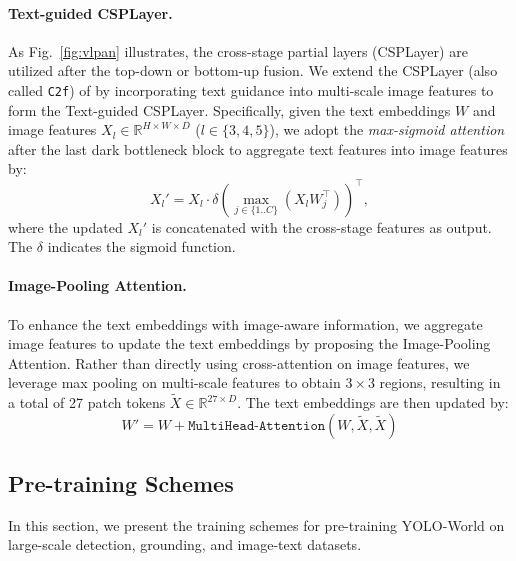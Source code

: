 \documentclass[10pt,twocolumn,letterpaper]{article}
\newcommand{\name}{YOLO-World}
\begin{document}
\paragraph{Text-guided CSPLayer.}
As Fig.~\ref{fig:vlpan} illustrates, the cross-stage partial layers (CSPLayer) are utilized after the top-down or bottom-up fusion.
We extend the CSPLayer (also called \texttt{C2f}) of \cite{yolov8_ultralytics} by incorporating text guidance into multi-scale image features to form the Text-guided CSPLayer.
Specifically, given the text embeddings $W$ and image features $X_l \in \mathbb{R}^{H\times W\times D}$ ($l \in \{3,4,5\}$),
we adopt the \textit{max-sigmoid attention} after the last dark bottleneck block to aggregate text features into image features by:
\begin{equation}
X_l' = X_l\cdot\delta(\max_{j\in\{1..C\}}(X_lW_j^{\top}))^{\top},
\end{equation}
where the updated $X_l'$ is concatenated with the cross-stage features as output. The $\delta$ indicates the sigmoid function.

\paragraph{Image-Pooling Attention.}
To enhance the text embeddings with image-aware information, we aggregate image features to update the text embeddings by proposing the Image-Pooling Attention.
Rather than directly using cross-attention on image features, we leverage max pooling on multi-scale features to obtain $3\!\times\!3$ regions, resulting in a total of 27 patch tokens $\tilde{X}\in \mathbb{R}^{27\times D}$.
The text embeddings are then updated by:
\begin{equation}
    W' = W + \texttt{MultiHead-Attention}(W, \tilde{X}, \tilde{X})
\end{equation}

\subsection{Pre-training Schemes}
In this section, we present the training schemes for pre-training \name{} on large-scale detection, grounding, and image-text datasets.
\end{document}

